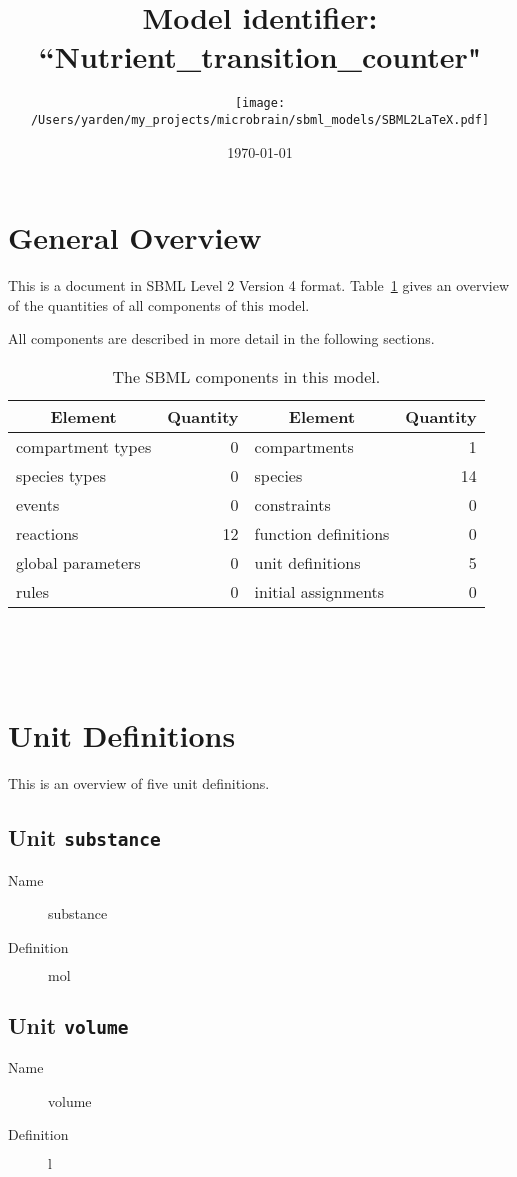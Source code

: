 \documentclass[11pt,twoside,bibtotoc,a4paper]{scrartcl}
\title{Model identifier: ``Nutrient\-\_transition\-\_counter"}
\date{\today}
\author{\texttt{[image: /Users/yarden/my\_projects/microbrain/sbml\_models/SBML2LaTeX.pdf]}}
\begin{document}
\maketitle
\thispagestyle{scrheadings}


\section{General Overview}
This is a document in SBML Level 2 Version 4 format. Table~\ref{tab:components} gives an overview of the quantities of all components of this model.
\begin{table}[h!]
\centering
\caption{The SBML components in this model.}\label{tab:components}
All components are described in more detail in the following sections.
\begin{tabular}{l|r||l|r}
\toprule
\multicolumn{1}{c}{Element}&\multicolumn{1}{|c||}{Quantity}&\multicolumn{1}{c|}{Element}&\multicolumn{1}{c}{Quantity}\\

\midrule
compartment types&0&compartments&1\\
species types&0&species&14\\
events&0&constraints&0\\
reactions&12&function definitions&0\\
global parameters&0&unit definitions&5\\
rules&0&initial assignments&0\\
\bottomrule\end{tabular}\\
\end{table}\\

\section{Unit Definitions}
This is an overview of five unit definitions.

\subsection{Unit \texttt{substance}}
\begin{description}
\item[Name] substance
\item[Definition] $\mathrm{mol}$
\end{description}

\subsection{Unit \texttt{volume}}
\begin{description}
\item[Name] volume
\item[Definition] $\mathrm{l}$
\end{description}
\end{document}

